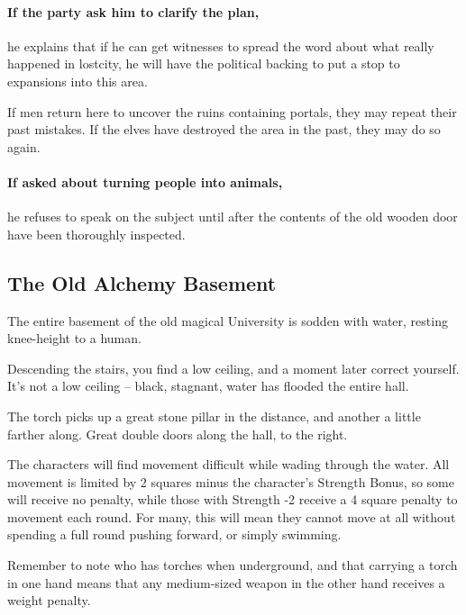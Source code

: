 \begin{multicols}{2}
\paragraph{If the party ask him to clarify the plan,}
he explains that if he can get witnesses to spread the word about what really happened in \gls{lostcity}, he will have the political backing to put a stop to expansions into this area.

If men return here to uncover the ruins containing portals, they may repeat their past mistakes.
If the elves have destroyed the area in the past, they may do so again.

\paragraph{If asked about turning people into animals,}
he refuses to speak on the subject until after the contents of the old wooden door have been thoroughly inspected.

\forestpriest

\subsection{The Old Alchemy Basement}\label{old_alchemy_basement}\setcounter{list}{0}

The entire basement of the old magical University is sodden with water, resting knee-height to a human.

\begin{boxtext}
  Descending the stairs, you find a low ceiling, and a moment later correct yourself.  It's not a low ceiling -- black, stagnant, water has flooded the entire hall.

  The torch picks up a great stone pillar in the distance, and another a little farther along.
  Great double doors along the hall, to the right.

\end{boxtext}

The characters will find movement difficult while wading through the water.  All movement is limited by 2 squares minus the character's Strength Bonus, so some will receive no penalty, while those with Strength -2 receive a 4 square penalty to movement each round.  For many, this will mean they cannot move at all without spending a full round pushing forward, or simply swimming.

Remember to note who has torches when underground, and that carrying a torch in one hand means that any medium-sized weapon in the other hand receives a weight penalty.


\end{multicols}
